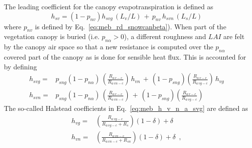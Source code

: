 
The leading coefficient for the canopy evapotranspiration is defined
as
%
\begin{equation}
\label{eq:meb_hsv}
%
h_{sv} = \left(1-p_{nv}\right) h_{svg}\,\left(L_v/{L}\right) 
\,+\, p_{nv}\, h_{svn}\,\left(L_s/{L}\right)
%
\end{equation}
%
where $ p_{nv}$ is defined by Eq.~\ref{eq:meb_rd_snowcanbeta}).
%
When part of the vegetation canopy is buried (i.e. $p_{n\alpha}>0$), 
a different roughness and $LAI$ are felt by the canopy air space so that
a new resistance is computed over the $p_{n \alpha}$ covered part of
the canopy
as is done for sensible heat flux. 
This is accounted for by defining
%
\begin{subequations}
\begin{align}
\label{eq:meb_h_v_n_a_svg}
%
h_{svg} =& p_{sng}\left(1-p_{n \alpha}\right)\,\left({\frac{R_{a\,v-c}}{R_{a\,vn-c}}}\right) \,h_{vn} \,+\,
\left(1-p_{sng}\right)\left({\frac{R_{a\,v-c}}{R_{a\,vg-c}}}\right) \,h_{vg} 
\\
%
\label{eq:meb_h_v_n_a_svn}
h_{svn} =& 
p_{sng}\left(1-p_{n \alpha}\right)\,\left({\frac{R_{a\,v-c}}{R_{a\,vn-c}}}\right) \,+\,
\left(1-p_{sng}\right)\left({\frac{R_{a\,v-c}}{R_{a\,vg-c}}}\right) 
%
\end{align}
\end{subequations}
%
%
The so-called Halstead coefficients in Eq.~\ref{eq:meb_h_v_n_a_svg}
are defined as
%
\begin{subequations}
\begin{align}
\label{eq:meb_hvg_halstead}
%
h_{vg} =& \left({\frac{R_{a\,vg-c}}{R_{a\,vg-c} + R_{s}}}\right)
\left(1-\delta\right) + \delta \,\,\,
\\
\label{eq:meb_hvn_halstead} 
h_{vn} =& \left({\frac{R_{a\,vn-c}}{R_{a\,vn-c} + R_{sn}}}\right)
\left(1-\delta\right) + \delta \,\,\,,
%
\end{align}
\end{subequations}
